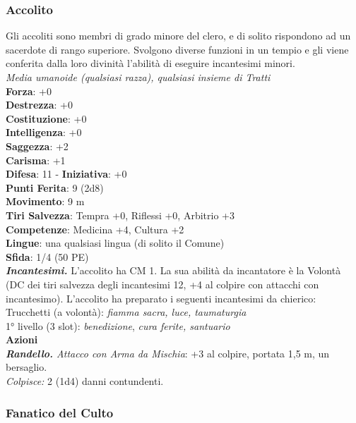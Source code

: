 \begin{multicols}{2}
\subsubsection{Accolito}

Gli accoliti sono membri di grado minore del clero, e di solito rispondono ad un sacerdote di rango superiore. Svolgono diverse funzioni in un tempio e gli viene conferita dalla loro divinità l'abilità di eseguire incantesimi minori.\\
\emph{Media umanoide (qualsiasi razza), qualsiasi insieme di Tratti}\\
\textbf{Forza}: +0\\
\textbf{Destrezza}: +0\\
\textbf{Costituzione}: +0\\
\textbf{Intelligenza}: +0\\
\textbf{Saggezza}: +2\\
\textbf{Carisma}: +1\\
\textbf{Difesa}: 11 - \textbf{Iniziativa}: +0\\
\textbf{Punti Ferita}: 9 (2d8)\\
\textbf{Movimento}: 9 m\\
\textbf{Tiri Salvezza}: Tempra +0, Riflessi +0, Arbitrio +3 \\
\textbf{Competenze}: Medicina +4, Cultura +2\\
\textbf{Lingue}: una qualsiasi lingua (di solito il Comune)\\
\textbf{Sfida}: 1/4 (50 PE)\smallskip\\
\emph{\textbf{Incantesimi.}} L'accolito ha CM 1. La sua abilità da incantatore è la Volontà (DC dei tiri salvezza degli incantesimi 12, +4 al colpire con attacchi con incantesimo). L'accolito ha preparato i seguenti incantesimi da chierico:\\
Trucchetti (a volontà): \emph{fiamma sacra, luce, taumaturgia} \\
1° livello (3 slot): \emph{benedizione}, \emph{cura ferite, santuario}\\
\smallskip\textbf{Azioni}\\
\emph{\textbf{Randello.} Attacco con Arma da Mischia}: +3 al colpire, portata 1,5 m, un bersaglio.\\
\emph{Colpisce:} 2 (1d4) danni contundenti.\\

\subsubsection{Fanatico del Culto}


\end{multicols}
